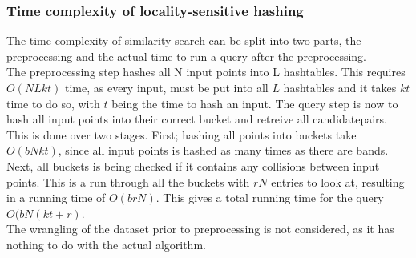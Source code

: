 \subsubsection{Time complexity of locality-sensitive hashing}
The time complexity of similarity search can be split into two parts, the preprocessing and the actual time to run a query after the preprocessing.\\
The preprocessing step hashes all N input points into L hashtables. This requires \(O(NLkt)\) time, as every input, must be put into all \(L\) hashtables and it takes \(kt\) time to do so, with \(t\) being the time to hash an input. The query step is 
now to hash all input points into their correct bucket and retreive all candidatepairs. \\
This is done over two stages. First; hashing all points into buckets take \(O(bNkt)\), since all input points is hashed as many times as there are bands. Next, all buckets is being checked if it contains any collisions between input points. This is a run through all the buckets with \(rN\) entries to look at, resulting in a running time of \(O(brN)\). This gives a total running time for the query \(O(bN(kt+r)\). \\
The wrangling of the dataset prior to preprocessing is not considered, as it has nothing to do with the actual algorithm.
